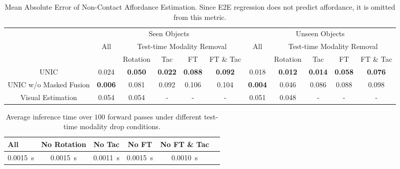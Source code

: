 \documentclass[letterpaper, 10 pt, conference]{ieeeconf}  %
\newcommand{\unic}{\textsc{UNIC}}
\begin{document}
\begin{table}[ttt]
\centering
\caption{Mean Absolute Error of Non-Contact Affordance Estimation. Since E2E regression does not predict affordance, it is omitted from this metric.}
\label{tab:non_contact}
\begin{tabular}{|c|ccccc|ccccc|}
\hline
\multirow{3}{*}{} & \multicolumn{5}{c|}{Seen Objects}                                                                                                                               & \multicolumn{5}{c|}{Unseen Objects}                                                   \\ \cline{2-11} 
                  & \multicolumn{1}{c|}{\multirow{2}{*}{All}} & \multicolumn{4}{c|}{Test-time Modality Removal}                                                                                              & \multicolumn{1}{c|}{\multirow{2}{*}{All}} & \multicolumn{4}{c|}{Test-time Modality Removal}                    \\ \cline{3-6} \cline{8-11} 
                  & \multicolumn{1}{c|}{}                     & \multicolumn{1}{c|}{Rotation} & \multicolumn{1}{c|}{Tac} & \multicolumn{1}{c|}{FT} & FT \& Tac & \multicolumn{1}{c|}{}                     & Rotation    & Tac   & FT    & FT \& Tac \\ \hline
\unic{}              & \multicolumn{1}{c|}{0.024}                & \textbf{0.050}          & \textbf{0.022}           & \textbf{0.088}          & \textbf{0.092}     & \multicolumn{1}{c|}{0.018}                & \textbf{0.012} & \textbf{0.014} & \textbf{0.058} & \textbf{0.076} \\
\unic{} w/o Masked Fusion  & \multicolumn{1}{c|}{\textbf{0.006}}       & 0.081                   & 0.092                    & 0.106                   & {0.104}     & \multicolumn{1}{c|}{\textbf{0.004}}  & 0.046 & 0.086 & 0.088 & 0.098 \\ 
Visual Estimation    & \multicolumn{1}{c|}{0.054}                  & 0.054                   & -                    & -                  & -      & \multicolumn{1}{c|}{{0.051}}       & 0.048 & - & - & -\\\hline
\end{tabular}
\end{table}

\begin{table}[ttt]
\centering
\caption{Average inference time over $100$ forward passes under different test-time modality drop conditions.}
\begin{tabular}{lccccc}
\toprule
\textbf{All} & \textbf{No Rotation} & \textbf{No Tac} & \textbf{No FT} & \textbf{No FT \& Tac} \\
\midrule
0.0015~s & 0.0015~s & 0.0011~s & 0.0015~s & 0.0010~s \\
\bottomrule
\end{tabular}
\label{tab:inference_time}
\end{table}
\end{document}
